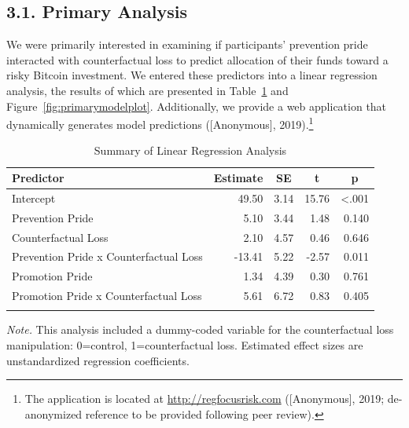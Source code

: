 \documentclass[man,floatsintext]{apa6}
\let\rmarkdownfootnote\footnote%
\def\footnote{\protect\rmarkdownfootnote}
\begin{document}
\hypertarget{primary-analysis}{%
\subsection{3.1. Primary Analysis}\label{primary-analysis}}

We were primarily interested in examining if participants' prevention pride interacted with counterfactual loss to predict allocation of their funds toward a risky Bitcoin investment. We entered these predictors into a linear regression analysis, the results of which are presented in Table~\ref{tab:primarymodelprint} and Figure~\ref{fig:primarymodelplot}. Additionally, we provide a web application that dynamically generates model predictions ({[}Anonymous{]}, 2019).\footnote{The application is located at \url{http://regfocusrisk.com} ({[}Anonymous{]}, 2019; de-anonymized reference to be provided following peer review).}

\begin{table}[tbp]

\begin{center}
\begin{threeparttable}

\caption{\label{tab:primarymodelprint}Summary of Linear Regression Analysis}

\begin{tabular}{lrrrr}
\toprule
Predictor & \multicolumn{1}{c}{Estimate} & \multicolumn{1}{c}{SE} & \multicolumn{1}{c}{t} & \multicolumn{1}{c}{p}\\
\midrule
Intercept & 49.50 & 3.14 & 15.76 & <.001\\
Prevention Pride & 5.10 & 3.44 & 1.48 & 0.140\\
Counterfactual Loss & 2.10 & 4.57 & 0.46 & 0.646\\
Prevention Pride x Counterfactual Loss & -13.41 & 5.22 & -2.57 & 0.011\\
Promotion Pride & 1.34 & 4.39 & 0.30 & 0.761\\
Promotion Pride x Counterfactual Loss & 5.61 & 6.72 & 0.83 & 0.405\\
\bottomrule
\addlinespace
\end{tabular}

\begin{tablenotes}[para]
\normalsize{\textit{Note.} This analysis included a dummy-coded variable for the counterfactual loss manipulation: 0=control, 1=counterfactual loss. Estimated effect sizes are unstandardized regression coefficients.}
\end{tablenotes}

\end{threeparttable}
\end{center}

\end{table}
\end{document}
